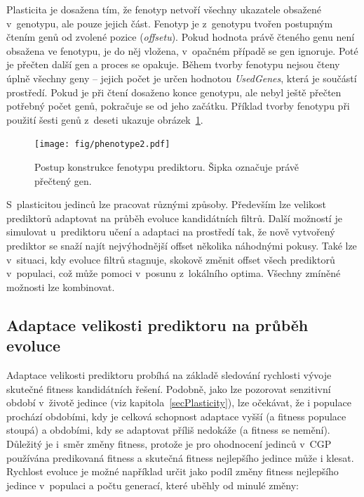 Plasticita je dosažena tím, že fenotyp netvoří všechny ukazatele obsažené v~genotypu, ale pouze jejich část. Fenotyp je z~genotypu tvořen postupným čtením genů od zvolené pozice (\emph{offsetu}). Pokud hodnota právě čteného genu není obsažena ve fenotypu, je do něj vložena, v~opačném případě se gen ignoruje. Poté je přečten další gen a proces se opakuje. Během tvorby fenotypu nejsou čteny úplně všechny geny -- jejich počet je určen hodnotou \emph{UsedGenes}, která je součástí prostředí. Pokud je při čtení dosaženo konce genotypu, ale nebyl ještě přečten potřebný počet genů, pokračuje se od jeho začátku. Příklad tvorby fenotypu při použití šesti genů z~deseti ukazuje obrázek~\ref{obrFenotyp}.

\begin{figure}[htb]
    \centering\texttt{[image: fig/phenotype2.pdf]}
    \caption{Postup konstrukce fenotypu prediktoru. Šipka označuje právě přečtený gen.}
    \label{obrFenotyp}
\end{figure}

S~plasticitou jedinců lze pracovat různými způsoby. Především lze velikost prediktorů adaptovat na průběh evoluce kandidátních filtrů. Další možností je simulovat u~prediktoru učení a adaptaci na prostředí tak, že nově vytvořený prediktor se snaží najít nejvýhodnější offset několika náhodnými pokusy. Také lze v~situaci, kdy evoluce filtrů stagnuje, skokově změnit offset všech prediktorů v~populaci, což může pomoci v~posunu z~lokálního optima. Všechny zmíněné možnosti lze kombinovat.

\subsection{Adaptace velikosti prediktoru na průběh evoluce}
\label{secDesignAdaptation}

Adaptace velikosti prediktoru probíhá na základě sledování rychlosti vývoje skutečné fitness kan\-di\-dát\-ních ře\-šení. Podobně, jako lze pozorovat senzitivní období v~životě jedince (viz kapitola~\ref{secPlasticity}), lze očekávat, že i populace prochází obdobími, kdy je celková schopnost adaptace vyšší (a fitness populace stoupá) a obdobími, kdy se adaptovat příliš nedokáže (a fitness se nemění). Důležitý je i~směr změny fitness, protože je pro ohodnocení je\-dinců v~CGP používána predikovaná fitness a skutečná fitness nejlepšího jedince může i klesat. Rychlost evoluce je možné například určit jako podíl změny fitness nej\-lep\-šího jedince v~populaci a počtu generací, které uběhly od minulé změny:

